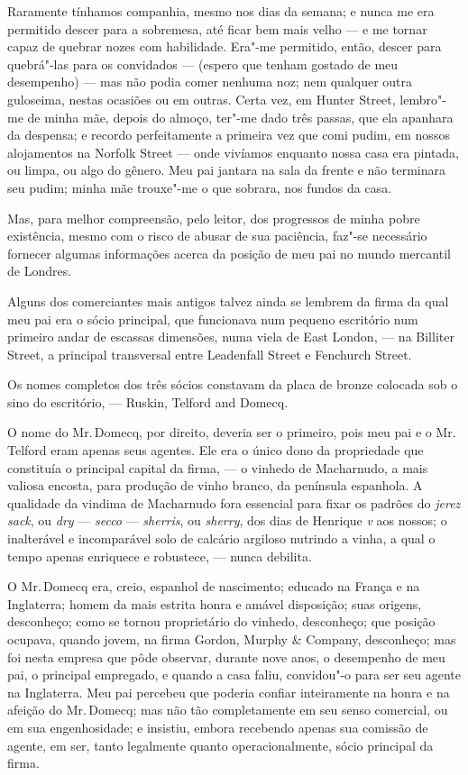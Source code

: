 {{{{{{{{{{{{%
Raramente tínhamos companhia, mesmo nos dias da semana; e nunca me
era permitido descer para a sobremesa, até ficar bem mais velho --- e me
tornar capaz de quebrar nozes com habilidade. Era"-me permitido, então,
descer para quebrá"-las para os convidados --- (espero que tenham gostado
de meu desempenho) --- mas não podia comer nenhuma noz; nem qualquer
outra guloseima, nestas ocasiões ou em outras. Certa vez, em Hunter
Street, lembro"-me de minha mãe, depois do almoço, ter"-me dado três
passas, que ela apanhara da despensa; e recordo perfeitamente a primeira
vez que comi pudim, em nossos alojamentos na Norfolk Street --- onde
vivíamos enquanto nossa casa era pintada, ou limpa, ou algo do gênero.
Meu pai jantara na sala da frente e não terminara seu pudim; minha mãe
trouxe"-me o que sobrara, nos fundos da casa.

Mas, para melhor compreensão, pelo leitor, dos progressos de minha
pobre existência, mesmo com o risco de abusar de sua paciência, faz"-se
necessário fornecer algumas informações acerca da posição de meu pai no
mundo mercantil de Londres.

Alguns dos comerciantes mais antigos talvez ainda se lembrem da firma da
qual meu pai era o sócio principal, que funcionava num pequeno
escritório num primeiro andar de escassas dimensões, numa viela de East
London, --- na Billiter Street, a principal transversal entre Leadenfall
Street e Fenchurch Street.

Os nomes completos dos três sócios constavam da placa de bronze colocada
sob o sino do escritório, --- Ruskin, Telford and Domecq.

O nome do Mr.\,Domecq, por direito, deveria ser o primeiro, pois meu pai e
o Mr.\,Telford eram apenas seus agentes. Ele era o único dono da
propriedade que constituía o principal capital da firma, --- o vinhedo de
Macharnudo, a mais valiosa encosta, para produção de vinho branco, da
península espanhola. A qualidade da vindima de Macharnudo fora essencial
para fixar os padrões do \textit{jerez sack}, ou \textit{dry} --- \textit{secco} --- \textit{sherris}, ou \textit{sherry}, dos dias de Henrique \textit{v} aos nossos; o inalterável e incomparável solo de calcário argiloso nutrindo a vinha, a qual o tempo apenas enriquece e robustece, --- nunca debilita.

O Mr.\,Domecq era, creio, espanhol de nascimento; educado na França e
na Inglaterra; homem da mais estrita honra e amável disposição; suas
origens, desconheço; como se tornou proprietário do vinhedo, desconheço;
que posição ocupava, quando jovem, na firma Gordon, Murphy \& Company,
desconheço; mas foi nesta empresa que pôde observar, durante nove anos,
o desempenho de meu pai, o principal empregado, e quando a casa faliu,
convidou"-o para ser seu agente na Inglaterra. Meu pai percebeu que
poderia confiar inteiramente na honra e na afeição do Mr.\,Domecq; mas não
tão completamente em seu senso comercial, ou em sua engenhosidade; e
insistiu, embora recebendo apenas sua comissão de agente, em ser, tanto
legalmente quanto operacionalmente, sócio principal da firma.

}}}}}}}}}}}}
